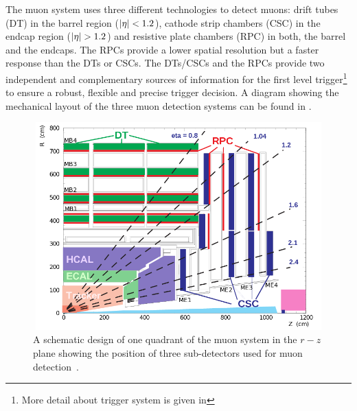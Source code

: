 The muon system uses three different technologies to detect muons: drift tubes (\gls{DT}) in the barrel 
region ($\lvert \eta \rvert<1.2$), cathode strip chambers (\gls{CSC}) in the endcap region ($\lvert \eta \rvert>1.2$) and resistive plate chambers (\gls{RPC}) in both, 
the barrel and the endcaps. The RPCs provide a lower spatial resolution but a faster response than the DTs or CSCs. The DTs/CSCs and the 
RPCs provide two independent and complementary sources of information for the first level trigger\footnote{More detail about trigger system is given
in \sectn{\ref{Se:triDas}}} to ensure a robust, flexible and precise trigger 
decision. A diagram showing the mechanical layout of the three muon detection systems can be found in \fig{\ref{fig:cmsMuonSystem}}.
\begin{figure}[h!]
 \centering
 \includegraphics[width=13cm,height=8cm]{ch2/figures/cmsMuonSystem.png}
 \caption{A schematic design of one quadrant of the muon system in the $r-z$ plane showing the position of three sub-detectors used for muon detection~\cite{Web:CERNcds}.}
 \label{fig:cmsMuonSystem}
\end{figure}

